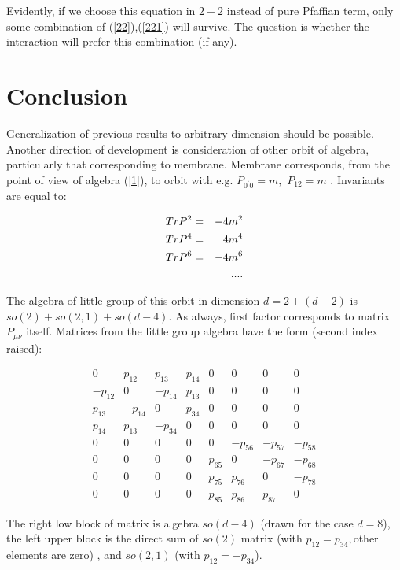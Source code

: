 \documentclass[a4paper,12pt]{article}
\begin{document}
Evidently, if we choose this equation in $2+2$ instead of pure
Pfaffian term, only some combination of (\ref{22}),(\ref{221})
will survive. The question is whether the interaction will prefer
this combination (if any).


\bigskip

\section{Conclusion}
Generalization of previous results to arbitrary dimension should
be possible. Another direction of development is consideration of
other orbit of algebra, particularly that corresponding to
membrane. Membrane corresponds, from the point of view of algebra
(\ref{1}), to orbit with e.g. $P_{0^{\prime }0}=m,$ $P_{12}=m$
\cite{F}. Invariants are equal to:

\begin{eqnarray}
TrP^{2} &=&-4m^{2}  \notag \\
TrP^{4} &=&4m^{4} \\
TrP^{6} &=&-4m^{6}  \notag \\
&&....  \notag
\end{eqnarray}

The algebra of little group of this orbit in dimension $d=2+(d-2)$
is $ so(2)+so(2,1)+so(d-4)$. As always, first factor corresponds
to matrix $ P_{\mu \nu }$ itself. Matrices from the little group
algebra have the form (second index raised):

\begin{equation}
\begin{array}{cccccccc}
0 & p_{12} & p_{13} & p_{14} & 0 & 0 & 0 & 0 \\
-p_{12} & 0 & -p_{14} & p_{13} & 0 & 0 & 0 & 0 \\
p_{13} & -p_{14} & 0 & p_{34} & 0 & 0 & 0 & 0 \\
p_{14} & p_{13} & -p_{34} & 0 & 0 & 0 & 0 & 0 \\
0 & 0 & 0 & 0 & 0 & -p_{56} & -p_{57} & -p_{58} \\
0 & 0 & 0 & 0 & p_{65} & 0 & -p_{67} & -p_{68} \\
0 & 0 & 0 & 0 & p_{75} & p_{76} & 0 & -p_{78} \\
0 & 0 & 0 & 0 & p_{85} & p_{86} & p_{87} & 0
\end{array}
\end{equation}

\bigskip

The right low block of matrix is algebra $so(d-4)$ (drawn for the
case $d=8$), the left upper block is the direct sum of $so(2)$
matrix (with $ p_{12}=p_{34},$other elements are zero) , and
$so(2,1)$ (with $p_{12}=-p_{34} $).
\end{document}
